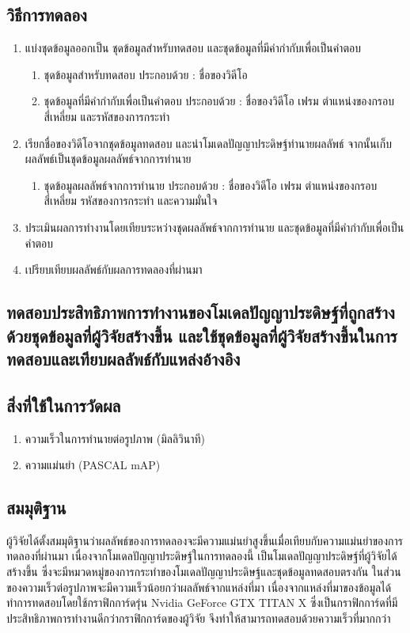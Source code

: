 \subsection*{วิธีการทดลอง}
	\begin{enumerate}
		\setlength\itemsep{-0.25em}
		\item แบ่งชุดข้อมูลออกเป็น ชุดข้อมูลสำหรับทดสอบ และชุดข้อมูลที่มีคำกำกับเพื่อเป็นคำตอบ
			\begin{enumerate}
				\setlength\itemsep{-0.25em}
				\item ชุดข้อมูลสำหรับทดสอบ ประกอบด้วย : ชื่อของวิดีโอ
				\item ชุดข้อมูลที่มีคำกำกับเพื่อเป็นคำตอบ ประกอบด้วย : ชื่อของวิดีโอ เฟรม ตำแหน่งของกรอบสี่เหลี่ยม และรหัสของการกระทำ
			\end{enumerate}
		\item เรียกชื่อของวิดีโอจากชุดข้อมูลทดสอบ และนำโมเดลปัญญาประดิษฐ์ทำนายผลลัพธ์ จากนั้นเก็บผลลัพธ์เป็นชุดข้อมูลผลลัพธ์จากการทำนาย
			\begin{enumerate}
				\setlength\itemsep{-0.25em}
				\item ชุดข้อมูลผลลัพธ์จากการทำนาย ประกอบด้วย : ชื่อของวิดีโอ เฟรม ตำแหน่งของกรอบสี่เหลี่ยม รหัสของการกระทำ และความมั่นใจ
			\end{enumerate}
		\item ประเมินผลการทำงานโดยเทียบระหว่างชุดผลลัพธ์จากการทำนาย และชุดข้อมูลที่มีคำกำกับเพื่อเป็นคำตอบ	
		\item เปรียบเทียบผลลัพธ์กับผลการทดลองที่ผ่านมา
\end{enumerate}
\clearpage
\subsection{ทดสอบประสิทธิภาพการทำงานของโมเดลปัญญาประดิษฐ์ที่ถูกสร้างด้วยชุดข้อมูลที่ผู้วิจัยสร้างขึ้น และใช้ชุดข้อมูลที่ผู้วิจัยสร้างขึ้นในการทดสอบและเทียบผลลัพธ์กับแหล่งอ้างอิง}
\subsection*{สิ่งที่ใช้ในการวัดผล}
	\begin{enumerate}
		\setlength\itemsep{-0.25em}
		\item ความเร็วในการทำนายต่อรูปภาพ (มิลลิวินาที)
		\item ความแม่นยำ (PASCAL mAP)
	\end{enumerate}
\subsection*{สมมุติฐาน}ผู้วิจัยได้ตั้งสมมุติฐานว่าผลลัพธ์ของการทดลองจะมีความแม่นยำสูงขึ้นเมื่อเทียบกับความแม่นยำของการทดลองที่ผ่านมา เนื่องจากโมเดลปัญญาประดิษฐ์ในการทดลองนี้ 
เป็นโมเดลปัญญาประดิษฐ์ที่ผู้วิจัยได้สร้างขึ้น ซึ่งจะมีหมวดหมู่ของการกระทำของโมเดลปัญญาประดิษฐ์และชุดข้อมูลทดสอบตรงกัน ในส่วนของความเร็วต่อรูปภาพจะมีความเร็วน้อยกว่าผลลัพธ์จากแหล่งที่มา 
เนื่องจากแหล่งที่มาของข้อมูลได้ทำการทดสอบโดยใช้กราฟิกการ์ดรุ่น Nvidia GeForce GTX TITAN X ซึ่งเป็นกราฟิกการ์ดที่มีประสิทธิภาพการทำงานดีกว่ากราฟิกการ์ดของผู้วิจัย จึงทำให้สามารถทดสอบด้วยความเร็วที่มากกว่า
